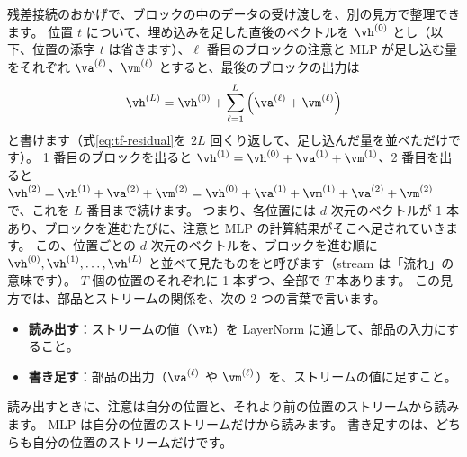 残差接続のおかげで、ブロックの中のデータの受け渡しを、別の見方で整理できます。
位置 $t$ について、埋め込みを足した直後のベクトルを $\vh^{(0)}$ とし（以下、位置の添字 $t$ は省きます）、$\ell$ 番目のブロックの注意と MLP が足し込む量をそれぞれ $\va^{(\ell)}$、$\vm^{(\ell)}$ とすると、最後のブロックの出力は
\begin{equation}
\vh^{(L)} = \vh^{(0)} + \sum_{\ell=1}^{L}\left(\va^{(\ell)} + \vm^{(\ell)}\right)
\label{eq:tf-stream}
\end{equation}
と書けます（式\eqref{eq:tf-residual}を $2L$ 回くり返して、足し込んだ量を並べただけです）。
1 番目のブロックを出ると $\vh^{(1)}=\vh^{(0)}+\va^{(1)}+\vm^{(1)}$、2 番目を出ると $\vh^{(2)}=\vh^{(1)}+\va^{(2)}+\vm^{(2)}=\vh^{(0)}+\va^{(1)}+\vm^{(1)}+\va^{(2)}+\vm^{(2)}$ で、これを $L$ 番目まで続けます。
つまり、各位置には $d$ 次元のベクトルが 1 本あり、ブロックを進むたびに、注意と MLP の計算結果がそこへ足されていきます。
この、位置ごとの $d$ 次元のベクトルを、ブロックを進む順に $\vh^{(0)},\vh^{(1)},\dots,\vh^{(L)}$ と並べて見たものをと呼びます（stream は「流れ」の意味です）。
$T$ 個の位置のそれぞれに 1 本ずつ、全部で $T$ 本あります。
この見方では、部品とストリームの関係を、次の 2 つの言葉で言います。
\begin{itemize}
\item \textbf{読み出す}：ストリームの値（$\vh$）を LayerNorm に通して、部品の入力にすること。
\item \textbf{書き足す}：部品の出力（$\va^{(\ell)}$ や $\vm^{(\ell)}$）を、ストリームの値に足すこと。
\end{itemize}
読み出すときに、注意は自分の位置と、それより前の位置のストリームから読みます。
MLP は自分の位置のストリームだけから読みます。
書き足すのは、どちらも自分の位置のストリームだけです。


